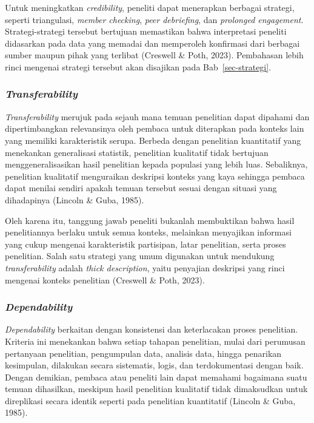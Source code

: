 \documentclass[
  indonesian,
  letterpaper,
  DIV=11,
  numbers=noendperiod]{scrreprt}
\begin{document}
Untuk meningkatkan \emph{credibility}, peneliti dapat menerapkan
berbagai strategi, seperti triangulasi, \emph{member checking},
\emph{peer debriefing}, dan \emph{prolonged engagement}.
Strategi-strategi tersebut bertujuan memastikan bahwa interpretasi
peneliti didasarkan pada data yang memadai dan memperoleh konfirmasi
dari berbagai sumber maupun pihak yang terlibat (Creswell \& Poth,
2023). Pembahasan lebih rinci mengenai strategi tersebut akan disajikan
pada Bab~\ref{sec-strategi}.

\subsubsection{\texorpdfstring{\emph{Transferability}}{Transferability}}\label{transferability}

\emph{Transferability} merujuk pada sejauh mana temuan penelitian dapat
dipahami dan dipertimbangkan relevansinya oleh pembaca untuk diterapkan
pada konteks lain yang memiliki karakteristik serupa. Berbeda dengan
penelitian kuantitatif yang menekankan generalisasi statistik,
penelitian kualitatif tidak bertujuan menggeneralisasikan hasil
penelitian kepada populasi yang lebih luas. Sebaliknya, penelitian
kualitatif menguraikan deskripsi konteks yang kaya sehingga pembaca
dapat menilai sendiri apakah temuan tersebut sesuai dengan situasi yang
dihadapinya (Lincoln \& Guba, 1985).

Oleh karena itu, tanggung jawab peneliti bukanlah membuktikan bahwa
hasil penelitiannya berlaku untuk semua konteks, melainkan menyajikan
informasi yang cukup mengenai karakteristik partisipan, latar
penelitian, serta proses penelitian. Salah satu strategi yang umum
digunakan untuk mendukung \emph{transferability} adalah \emph{thick
description}, yaitu penyajian deskripsi yang rinci mengenai konteks
penelitian (Creswell \& Poth, 2023).

\subsubsection{\texorpdfstring{\emph{Dependability}}{Dependability}}\label{dependability}

\emph{Dependability} berkaitan dengan konsistensi dan keterlacakan
proses penelitian. Kriteria ini menekankan bahwa setiap tahapan
penelitian, mulai dari perumusan pertanyaan penelitian, pengumpulan
data, analisis data, hingga penarikan kesimpulan, dilakukan secara
sistematis, logis, dan terdokumentasi dengan baik. Dengan demikian,
pembaca atau peneliti lain dapat memahami bagaimana suatu temuan
dihasilkan, meskipun hasil penelitian kualitatif tidak dimaksudkan untuk
direplikasi secara identik seperti pada penelitian kuantitatif (Lincoln
\& Guba, 1985).
\end{document}
